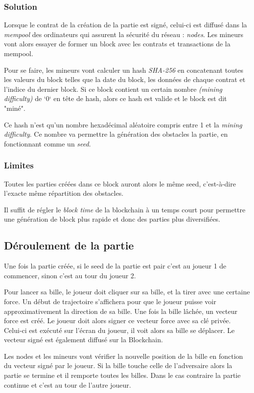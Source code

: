 \documentclass{article}
\begin{document}
\subsubsection{Solution}

Lorsque le contrat de la création de la partie est signé, celui-ci est diffusé dans la \textit{mempool} des ordinateurs qui assurent la sécurité du réseau : \textit{nodes}. Les mineurs vont alors essayer de former un block avec les contrats et transactions de la mempool.

Pour se faire, les mineurs vont calculer un hash \textit{SHA-256} en concatenant toutes les valeurs du block telles que la date du block, les données de chaque contrat et l'indice du dernier block. Si ce block contient un certain nombre \textit{(mining difficulty)} de `0` en tête de hash, alors ce hash est valide et le block est dit "miné".

Ce hash n'est qu'un nombre hexadécimal aléatoire compris entre 1 et la \textit{mining difficulty}. Ce nombre va permettre la génération des obstacles la partie, en fonctionnant comme un \textit{seed}.

\subsubsection{Limites}
Toutes les parties créées dans ce block auront alors le même seed, c'est-à-dire l'exacte même répartition des obstacles.  

Il suffit de régler le \textit{block time} de la blockchain à un temps court pour permettre une génération de block plus rapide et donc des parties plus diversifiées. 

\subsection{Déroulement de la partie}
Une fois la partie créée, si le seed de la partie est pair c'est au joueur 1 de commencer, sinon c'est au tour du joueur 2.

Pour lancer sa bille, le joueur doit cliquer sur sa bille, et la tirer avec une certaine force. Un début de trajectoire s'affichera pour que le joueur puisse voir approximativement la direction de sa bille.
Une fois la bille lâchée, un vecteur force est créé. Le joueur doit alors signer ce vecteur force avec sa clé privée. Celui-ci est exécuté sur l'écran du joueur, il voit alors sa bille se déplacer. Le vecteur signé est également diffusé sur la Blockchain.

Les nodes et les mineurs vont vérifier la nouvelle position de la bille en fonction du vecteur signé par le joueur. Si la bille touche celle de l'adversaire alors la partie se termine et il remporte toutes les billes. Dans le cas contraire la partie continue et c'est au tour de l'autre joueur.
\end{document}
